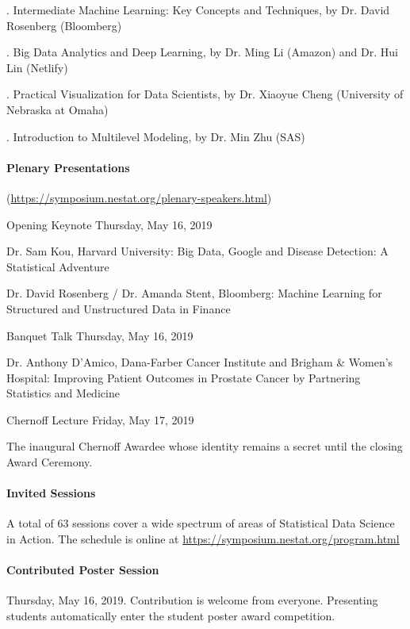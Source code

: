 \documentclass[12pt]{article}
\begin{document}
. %
Intermediate Machine Learning: Key Concepts and Techniques, by Dr. David Rosenberg (Bloomberg)

. %
Big Data Analytics and Deep Learning, by Dr. Ming Li (Amazon) and Dr. Hui Lin (Netlify)

. %
Practical Visualization for Data Scientists, by Dr. Xiaoyue Cheng (University of Nebraska at Omaha)

. %
Introduction to Multilevel Modeling, by Dr. Min Zhu (SAS)

\paragraph{Plenary Presentations} (\url{https://symposium.nestat.org/plenary-speakers.html})

\noindent\textsf{Opening Keynote} Thursday, May 16, 2019

Dr. Sam Kou, Harvard University: Big Data, Google and Disease Detection: A Statistical Adventure

Dr. David Rosenberg / Dr. Amanda Stent, Bloomberg: Machine Learning for Structured and Unstructured Data in Finance

\noindent\textsf{Banquet Talk} Thursday, May 16, 2019

Dr. Anthony D'Amico,   Dana-Farber Cancer Institute and Brigham \& Women's Hospital: Improving Patient Outcomes in Prostate Cancer by Partnering Statistics and Medicine

\noindent\textsf{Chernoff Lecture} Friday, May 17, 2019

The inaugural Chernoff Awardee whose identity remains a secret until the closing Award Ceremony.

\paragraph{Invited Sessions}
A total of 63 sessions cover a wide spectrum of areas of Statistical Data Science in Action. %
The schedule is online at \url{https://symposium.nestat.org/program.html}

\paragraph{Contributed Poster Session} Thursday, May 16, 2019.
Contribution is welcome from everyone.
Presenting students automatically enter the student poster award competition.
\end{document}
